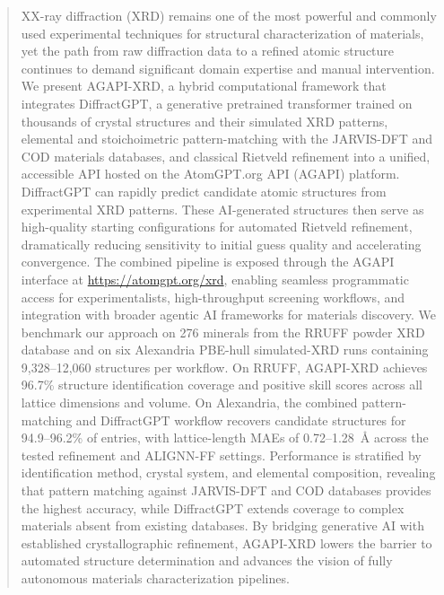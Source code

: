 \documentclass[pdflatex,sn-mathphys-num]{sn-jnl}
\theoremstyle{thmstyleone}
\theoremstyle{thmstyletwo}
\theoremstyle{thmstylethree}
\begin{document}
\begin{abstract}
XX-ray diffraction (XRD) remains one of the most powerful and commonly used experimental techniques 
for structural characterization of materials, yet the path from raw diffraction data to a refined 
atomic structure continues to demand significant domain expertise and manual 
intervention. We present AGAPI-XRD, a hybrid computational framework that integrates 
DiffractGPT, a generative pretrained transformer trained on thousands of crystal 
structures and their simulated XRD patterns, elemental and stoichoimetric pattern-matching with the JARVIS-DFT and COD materials databases, and classical Rietveld refinement 
into a unified, accessible API hosted on the AtomGPT.org API (AGAPI) platform. 
DiffractGPT can rapidly predict candidate atomic structures from experimental XRD 
patterns. These AI-generated structures then serve as high-quality starting 
configurations for automated Rietveld refinement, dramatically reducing sensitivity 
to initial guess quality and accelerating convergence. The combined pipeline is 
exposed through the AGAPI interface at \url{https://atomgpt.org/xrd}, enabling 
seamless programmatic access for experimentalists, high-throughput screening 
workflows, and integration with broader agentic AI frameworks for materials 
discovery. We benchmark our approach on 276 minerals from the RRUFF powder XRD 
database and on six Alexandria PBE-hull simulated-XRD runs containing 
9{,}328--12{,}060 structures per workflow. On RRUFF, AGAPI-XRD achieves 96.7\% 
structure identification coverage and positive skill scores across all lattice 
dimensions and volume. On Alexandria, the combined pattern-matching and 
DiffractGPT workflow recovers candidate structures for 94.9--96.2\% of entries, 
with lattice-length MAEs of 0.72--1.28~\AA{} across the tested refinement and 
ALIGNN-FF settings. Performance is stratified by identification method, crystal 
system, and elemental composition, revealing that pattern matching against 
JARVIS-DFT and COD databases provides the highest accuracy, while DiffractGPT 
extends coverage to complex materials absent from existing databases. 
By bridging generative AI with established crystallographic refinement, AGAPI-XRD 
lowers the barrier to automated structure determination and advances the vision of 
fully autonomous materials characterization pipelines.
\end{abstract}

\end{document}

